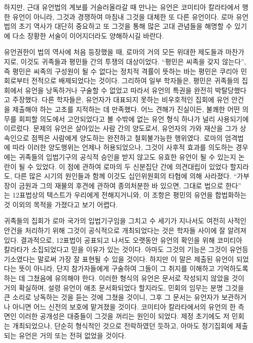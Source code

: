 하지만,
근대 유언법의 계보를 거슬러올라갈 때 만나는 유언은
코미티아 칼라타에서 행한 유언이 아니라,
그것과 경쟁하여 마침내 그것을 대체한 또 다른 유언이다.
로마 유언법의 초기 역사가 대단히 중요하고
또 그것을 통해 많은 고대 관념들을 해명할 수 있기에
다소 장황한 서술이 이어지더라도 양해하시길 바란다.

유언권한이 법의 역사에 처음 등장했을 때,
로마의 거의 모든 위대한 제도들과 마찬가지로,
이것도 귀족들과 평민들 간의 투쟁의 대상이었다.
``평민은 씨족을 갖지 않는다'',
즉 평민은 씨족의 구성원이 될 수 없다는 정치적 격률이 뜻하는 바는
평민은 쿠리아 민회로부터 전적으로 배제되었다는 것이다.
그리하여 일부 학자들은, 평민은 귀족들의 집회에서 유언을
낭독하거나 구술할 수 없었고
따라서 유언의 특권을 완전히 박탈당했다고 주장했다.
다른 학자들은, 유언자가 대표되지 못하는 비우호적인 집회에
유언 안건을 제출해야 하는 고초를 지적하는 데 만족했다.
어느 견해가 진실이든,
불쾌한 어떤 의무를 회피할 의도에서 고안되었다고 볼 수밖에 없는
유언 형식 하나가 널리 사용되기에 이르렀다.
문제의 유언은 살아있는 사람 간의 양도로서,
유언자의 가와 재산을 그가 상속인으로 점찍은 사람에게 양도하는
완전하고 철회불가능한 행위였다.
로마의 엄격법에 따라 이러한 양도행위는 언제나 허용되었으나,
그것이 사후적 효과를 의도하는 경우에는
귀족들의 입법기구의 공식적 승인을 받지 않고도 유효한 유언이 될 수 있는지
논란이 될 수 있었다.
이 점에 관하여 로마의 두 신분집단 간에 의견대립이 있었다 할지라도,
다른 많은 시기의 원인들과 함께
이것도 십인위원회의
타협에 의해 사라졌다.
``가부장이 금원과 그의 재물의 후견에 관하여 종의처분한 바
있으면, 그대로 법으로 한다''%
는
12표법상의 텍스트가 우리에게 전해지거니와,
이 조항은
평민의 유언을 합법화하는 것 이외의 목적을 가졌다고 보기 어렵다.

귀족들의 집회가 로마 국가의 입법기구임을 그치고 수 세기가 지나서도
여전히 사적인 안건을 처리하기 위해 그것이 공식적으로 개최되었다는 것은
학자들 사이에 잘 알려져 있다.
결과적으로, 12표법이 공표되고 나서도 오랫동안
유언의 확인을 위해 코미티아 칼라타가 소집되었다고 믿을 이유가 있는 것이다.
아마도 그것의 기능은
그것이 유언등기소였다는
말로써 가장 잘 표현될 수 있을 것이다.
하지만 이 말은 제출된 유언이 되었다는
뜻이 아니라,
단지 참가자들에게 구술하여 그들이 그 취지를 이해하고 기억하도록 하는 데
그쳤음에 유의해야 한다.
이러한 형식의 유언은 문서로 작성되지 않았을 것이 거의 확실하며,
설령 유언이 애초 문서화되었다 할지라도, 민회의 임무는 분명
그것을 큰 소리로 낭독하는 것을 듣는 것에 그쳤을 것이니,
그후 그 문서는 유언자가 보관하거나 아니면
어느 신전의 보호에 맡겨졌을 것이다.
코미티아 칼라타에서의 유언의 한 측면인
이러한 공개성은 대중들이 그것을 꺼리는 원인이 되었다.
제정 초기에도 저 민회는 개최되었으나,
단순히 형식적인 것으로 전락하였던 듯하고, 아마도
정기집회에 제출되는 유언은 거의 또는 전혀 없었을 것이다.

